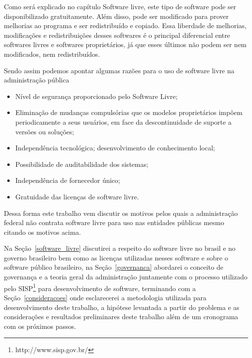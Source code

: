 Como será explicado no capítulo Software livre, este tipo de software pode ser disponibilizado
gratuitamente. Além disso, pode ser modificado para prover melhorias ao
programa e ser redistribuído e copiado. Essa liberdade de melhorias, modificações e redistribuições
desses softwares é o principal diferencial entre softwares livres e softwares proprietários, já que
esses últimos não podem ser nem modificados, nem redistribuídos.

Sendo assim podemos apontar algumas razões para o uso de software livre na administração 
pública

\begin{itemize}

\item Nível de segurança proporcionado pelo Software Livre;
\item Eliminação de mudanças compulsórias que os modelos proprietários impõem
periodicamente a seus usuários, em face da descontinuidade de suporte a
versões ou soluções; 
\item Independência tecnológica; desenvolvimento de
conhecimento local; 
\item Possibilidade de auditabilidade dos sistemas;
\item Independência de fornecedor único;
\item Gratuidade das licenças de software livre.
\end{itemize}

Dessa forma este trabalho vem discutir os motivos pelos quais a administração 
federal não contrata software livre para uso nas entidades públicas mesmo citando 
os motivos acima.

Na Seção~\ref{software_livre} discutirei a respeito do software livre no brasil e no governo 
brasileiro bem como as licenças utilizadas nesses software e sobre o software público 
brasileiro,
%
na Seção~\ref{governanca} abordarei o conceito de governança e a teoria geral
da administração juntamente com o processo utilizado pelo SISP\footnote{http://www.sisp.gov.br/}
para desenvolvimento de software,
%
terminando com a Seção~\ref{consideracoes} onde esclarecerei a metodologia utilizada para desenvolvimento
deste trabalho, a hipótese levantada a partir do problema e as considerações e resultados preliminares 
deste trabalho além de um cronograma com os próximos passos. 


